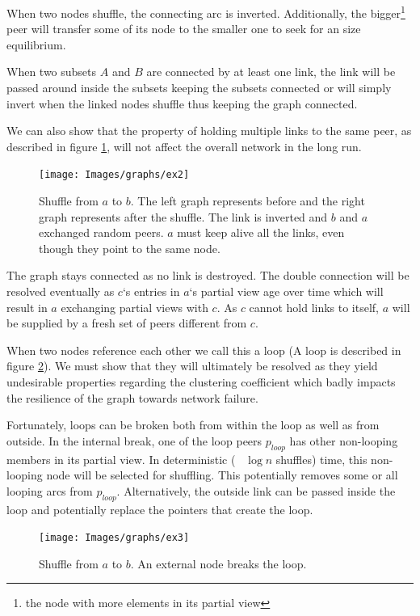 \documentclass[11pt, english, screen]{report-rd-info}
\begin{document}
When two nodes shuffle, the connecting arc is inverted. 
Additionally, the bigger\footnote{the node with more elements in its partial view} peer will transfer some of its node to the smaller one to seek for an size equilibrium. 

When two subsets $A$ and $B$ are connected by at least one link, the link will be passed around inside the subsets keeping the subsets connected or will simply invert when the linked nodes shuffle thus keeping the graph connected.

We can also show that the property of holding multiple links to the same peer, as described in figure \ref{fig:ex2}, will not affect the overall network in the long run.

\begin{figure}
    \centering
    \texttt{[image: Images/graphs/ex2]}
    \caption{Shuffle from $a$ to $b$. The left graph represents before and the right graph represents after the shuffle. The link is inverted and $b$ and $a$ exchanged random peers.
    $a$ must keep alive all the links, even though they point to the same node.}
    \label{fig:ex2}
\end{figure}

The graph stays connected as no link is destroyed. 
The double connection will be resolved eventually as $c$`s entries in $a$`s partial view age over time which will result in $a$ exchanging partial views with $c$. As $c$ cannot hold links to itself, $a$ will be supplied by a fresh set of peers different from $c$.

When two nodes reference each other we call this a loop (A loop is described in figure \ref{fig:ex3}).
We must show that they will ultimately be resolved as they yield undesirable properties regarding the clustering coefficient which badly impacts the resilience of the graph towards network failure. 

Fortunately, loops can be broken both from within the loop as well as from outside.
In the internal break, one of the loop peers $p_{loop}$ has other non-looping members in its partial view. 
In deterministic (~ $\log{n}$ shuffles) time, this non-looping node will be selected for shuffling.
This potentially removes some or all looping arcs from $p_{loop}$.
Alternatively, the outside link can be passed inside the loop and potentially replace the pointers that create the loop.

\begin{figure}
    \centering
    \texttt{[image: Images/graphs/ex3]}
    \caption{Shuffle from $a$ to $b$. An external node breaks the loop.}
    \label{fig:ex3}
\end{figure}
\end{document}
